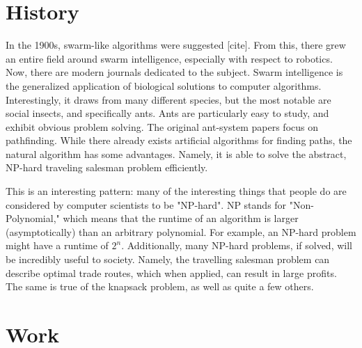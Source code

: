 \documentclass{nature}
\begin{document}
\section{History}

    In the 1900s, swarm-like algorithms were suggested [cite].
    From this, there grew an entire field around swarm intelligence, especially with respect to robotics.
    Now, there are modern journals dedicated to the subject.
    Swarm intelligence is the generalized application of biological solutions to computer algorithms.
    Interestingly, it draws from many different species, but the most notable are social insects, and specifically ants.
    Ants are particularly easy to study, and exhibit obvious problem solving.
    The original ant-system papers focus on pathfinding.
    While there already exists artificial algorithms for finding paths, the natural algorithm has some advantages.
    Namely, it is able to solve the abstract, NP-hard traveling salesman problem efficiently. 

    This is an interesting pattern: many of the interesting things that people do are considered by computer scientists to be "NP-hard".
    NP stands for "Non-Polynomial," which means that the runtime of an algorithm is larger (asymptotically) than an arbitrary polynomial.
    For example, an NP-hard problem might have a runtime of $2^n$. 
    Additionally, many NP-hard problems, if solved, will be incredibly useful to society.
    Namely, the travelling salesman problem can describe optimal trade routes, which when applied, can result in large profits.
    The same is true of the knapsack problem, as well as quite a few others.



\section{Work}
\end{document}
